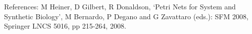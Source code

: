 \documentclass[12pt,a4paper,draft]{article}
\begin{document}
    
    
    References:
    M Heiner, D Gilbert, R Donaldson, ‘Petri Nets for System and Synthetic Biology’, M Bernardo, P Degano and G Zavattaro (eds.): SFM 2008, Springer LNCS 5016, pp 215-264, 2008.
    



\end{document}
